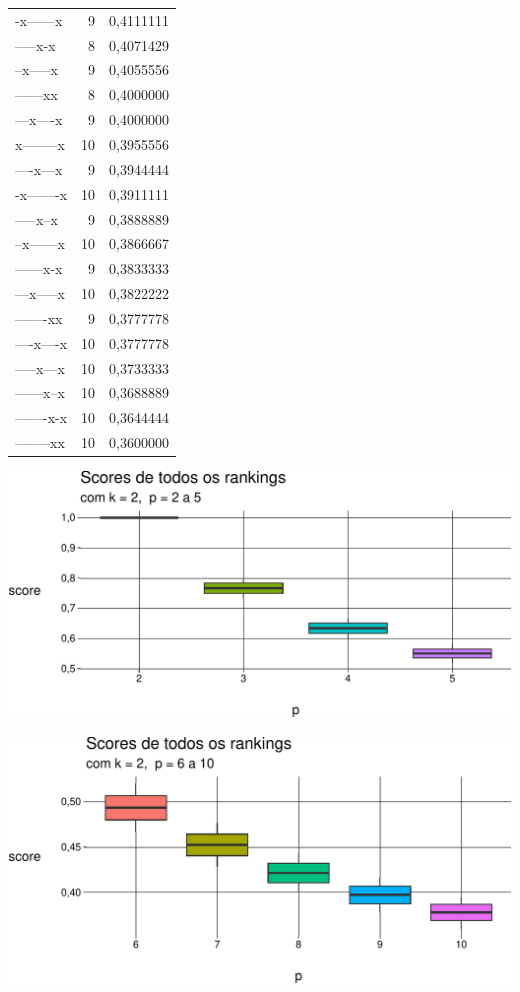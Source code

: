\documentclass[
  letterpaper,
  DIV=11,
  numbers=noendperiod]{scrreprt}
\begin{document}
\begin{longtable*}{lrr}
-x------x & 9 & 0,4111111 \\ 
-----x-x & 8 & 0,4071429 \\ 
--x-----x & 9 & 0,4055556 \\ 
------xx & 8 & 0,4000000 \\ 
---x----x & 9 & 0,4000000 \\ 
x--------x & 10 & 0,3955556 \\ 
----x---x & 9 & 0,3944444 \\ 
-x-------x & 10 & 0,3911111 \\ 
-----x--x & 9 & 0,3888889 \\ 
--x------x & 10 & 0,3866667 \\ 
------x-x & 9 & 0,3833333 \\ 
---x-----x & 10 & 0,3822222 \\ 
-------xx & 9 & 0,3777778 \\ 
----x----x & 10 & 0,3777778 \\ 
-----x---x & 10 & 0,3733333 \\ 
------x--x & 10 & 0,3688889 \\ 
-------x-x & 10 & 0,3644444 \\ 
--------xx & 10 & 0,3600000 \\ 
\bottomrule
\end{longtable*}

\begin{center}
\includegraphics[width=1\textwidth,height=\textheight]{usando-posicoes_files/figure-pdf/unnamed-chunk-12-1.pdf}
\end{center}

\begin{center}
\includegraphics[width=1\textwidth,height=\textheight]{usando-posicoes_files/figure-pdf/unnamed-chunk-13-1.pdf}
\end{center}
\end{document}
